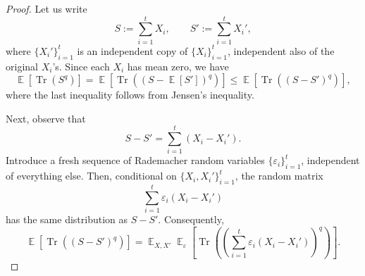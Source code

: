 \documentclass[11pt,letterpaper]{article}
\DeclareMathOperator*{\E}{\mathbb{E}}
\DeclareMathOperator*{\Tr}{Tr}
\newcommand{\1}{\mathbbm{1}}
\begin{document}
\begin{proof}
Let us write
\[
   S  :=  \sum_{i=1}^t X_i,\qquad
   S'  :=  \sum_{i=1}^t X_i',
\]
where $\{X_i'\}_{i=1}^t$ is an independent copy of $\{X_i\}_{i=1}^t$, independent also of the original $X_i$’s.  Since each $X_i$ has mean zero, we have
\[
   \E\left[\Tr\left(S^{q}\right)\right]
    = 
   \E\left[\Tr\left(( S - \E[S'] )^{q}\right)\right]
    \le 
   \E\left[\Tr\left(( S - S' )^{q}\right)\right],
\]
where the last inequality follows from Jensen’s inequality.

Next, observe that
\[
   S - S'  =  \sum_{i=1}^t \left(X_i - X_i'\right).
\]
Introduce a fresh sequence of Rademacher random variables $\{\varepsilon_i\}_{i=1}^t$, independent of everything else.  Then, conditional on $\{X_i,X_i'\}_{i=1}^t$, the random matrix
\[
   \sum_{i=1}^t \varepsilon_i \left(X_i - X_i'\right)
\]
has the same distribution as $ S - S'$.
Consequently,
\[
   \E\left[\Tr\left(( S - S' )^{q}\right)\right]
    = 
   \E_{ X,X'} \E_{ \varepsilon}\left[\Tr\left(\left(\sum_{i=1}^t \varepsilon_i (X_i - X_i')\right)^{q}\right)\right].
\]


\end{proof}
\end{document}
